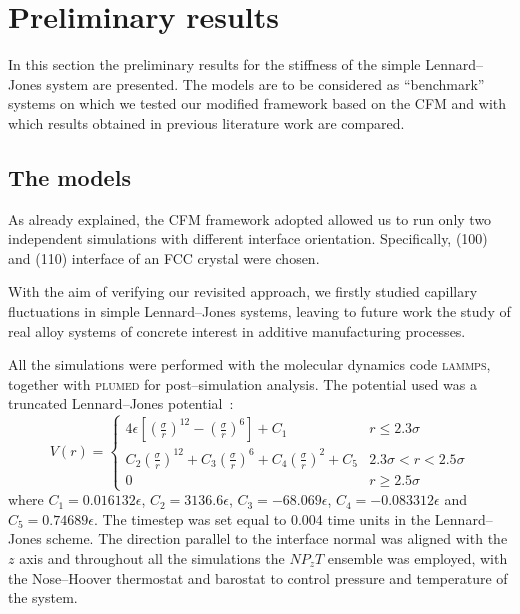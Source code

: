 \section{Preliminary results\label{sec:results}}
In this section the preliminary results for the stiffness of the simple Lennard--Jones system are presented. The models are to be considered as ``benchmark'' systems on which we tested our modified framework based on the CFM and with which results obtained in previous literature work are compared.

\subsection{The models}
As already explained, the CFM framework adopted allowed us to run only two independent simulations with different interface orientation. Specifically, (100) and (110) interface of an FCC crystal were chosen.

With the aim of verifying our revisited approach, we firstly studied capillary fluctuations in simple Lennard--Jones systems, leaving to future work the study of real alloy systems of concrete interest in additive manufacturing processes.

All the simulations were performed with the molecular dynamics code \textsc{lammps}, together with \textsc{plumed} for post--simulation analysis. The potential used was a truncated Lennard--Jones potential~\cite{Cheng2015}:
\begin{equation}
    \label{eqn:LJ}
    V(r)=
    \begin{cases}
        4\epsilon\left[ \left(\frac{\sigma}{r}\right)^{12} - \left( \frac{\sigma}{r}\right)^6 \right] + C_1 & r\le 2.3\sigma \\
        C_2 \left(\frac{\sigma}{r}\right)^{12}+ C_3 \left(\frac{\sigma}{r}\right)^6 + C_4 \left(\frac{\sigma}{r}\right)^2 + C_5 & 2.3\sigma < r < 2.5\sigma \\
        0 & r\ge 2.5\sigma
    \end{cases}
\end{equation}
where $C_1=0.016132\epsilon$, $C_2=3136.6\epsilon$, $C_3=-68.069\epsilon$, $C_4=-0.083312\epsilon$ and $C_5=0.74689\epsilon$. The timestep was set equal to 0.004 time units in the Lennard--Jones scheme. The direction parallel to the interface normal was aligned with the $z$ axis and throughout all the simulations the $NP_zT$ ensemble was employed, with the Nose--Hoover thermostat and barostat to control pressure and temperature of the system.

